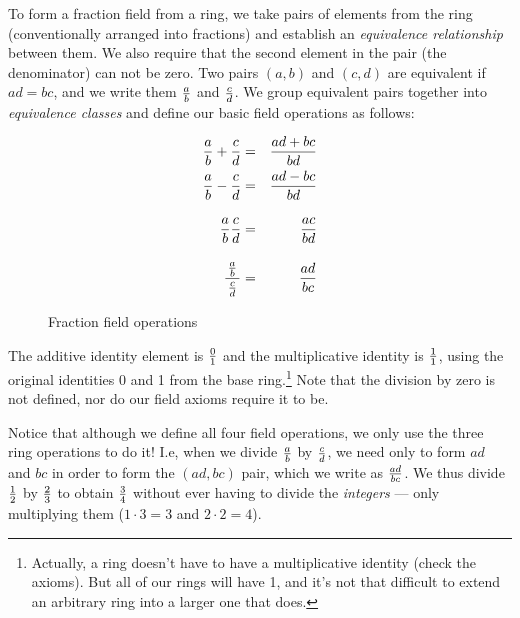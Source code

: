To form a fraction field from a ring, we take pairs of elements from
the ring (conventionally arranged into fractions) and establish an
{\it equivalence relationship} between them.  We also require that the
second element in the pair (the denominator) can not be zero.  Two
pairs $(a,b)$ and $(c,d)$ are equivalent if $ad=bc$, and we write them
$a\over b$ and $c\over d$.  We group equivalent pairs together into
{\it equivalence classes} and define our basic field operations as
follows:

\begin{figure}[h]
\label{fraction field operations}
\begin{mdframed}[backgroundcolor=cyan!20]
\begin{center}
\begin{eqnarray*}
{a\over b} + {c\over d} &=& {{ad+bc}\over{bd}} \cr
{a\over b} - {c\over d} &=& {{ad-bc}\over{bd}} \cr
{a\over b} {c\over d} &=& {{ac}\over{bd}} \vbox to20pt{}\cr
{\,{a\over b}\, \over {c \over d}} &=& {{ad}\over{bc}} \vbox to24pt{}\cr
\end{eqnarray*}
\end{center}
\end{mdframed}
\caption{Fraction field operations}
\end{figure}

The additive identity element is $0\over1$ and the multiplicative
identity is $1\over1$, using the original identities 0 and 1 from the
base ring.\footnote{Actually, a ring doesn't have to have a
multiplicative identity (check the axioms).  But all of
our rings will have 1, and it's not that difficult to extend
an arbitrary ring into a larger one that does.}
Note that the division by zero is not defined, nor do
our field axioms require it to be.

Notice that although we define all four field operations, we only
use the three ring operations to do it!  I.e, when we divide
$a\over b$ by $c\over d$, we need only to form $ad$ and $bc$
in order to form the $(ad,bc)$ pair, which we write as ${ad}\over{bc}$.
We thus divide $1\over2$ by $2\over3$ to obtain $3\over4$
without ever having to divide the {\it integers} ---
only multiplying them ($1\cdot3=3$ and $2\cdot2=4$).

